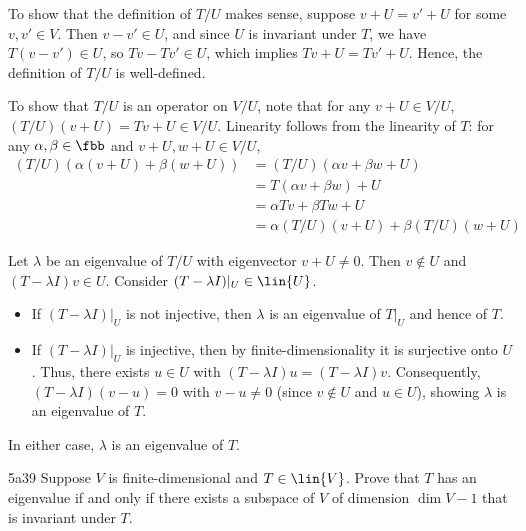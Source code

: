 \begin{solenum}
    \item  To show that the definition of $T / U$ makes sense, suppose $v + U = v' + U$ for some $v, v' \in V$.
	Then $v - v' \in U$, and since $U$ is invariant under $T$, we have $T(v - v') \in U$, so $Tv - Tv' \in U$, which implies $Tv + U = Tv' + U$.
	Hence, the definition of $T / U$ is well-defined.

    To show that $T / U$ is an operator on $V / U$, note that for any $v + U \in V / U$, $(T / U)(v + U) = Tv + U \in V / U$.
	Linearity follows from the linearity of $T$: for any $\alpha, \beta \in \fbb$ and $v + U, w + U \in V / U$,
    \begin{align*}
        (T / U)(\alpha(v + U) + \beta(w + U)) &= (T / U)(\alpha v + \beta w + U) \\
        &= T(\alpha v + \beta w) + U \\
        &= \alpha Tv + \beta Tw + U \\
        &= \alpha(T / U)(v + U) + \beta(T / U)(w + U)
    \end{align*}
    \item Let $\lambda$ be an eigenvalue of $T/U$ with eigenvector $v+U \neq 0$.
    Then $v \notin U$ and $(T-\lambda I)v \in U$.
    Consider $(T-\lambda I) \vert_U \in \lin{U}$.
    \begin{itemize}
        \item If $(T-\lambda I) \vert_U$ is not injective, then $\lambda$ is an eigenvalue of $T \vert_U$ and hence of $T$.
        \item If $(T-\lambda I) \vert_U$ is injective, then by finite-dimensionality it is surjective onto $U$. Thus, there exists $u \in U$ with $(T-\lambda I)u = (T-\lambda I)v$.
        Consequently, $(T-\lambda I)(v-u)=0$ with $v-u \neq 0$ (since $v \notin U$ and $u \in U$), showing $\lambda$ is an eigenvalue of $T$.
    \end{itemize}
    In either case, $\lambda$ is an eigenvalue of $T$.
\end{solenum}

\begin{exercise}{5a39}
    Suppose $V$ is finite-dimensional and $T \in \lin{V}$.
	Prove that $T$ has an eigenvalue if and only if there exists a subspace of $V$ of dimension $\dim V - 1$ that is invariant under $T$.
\end{exercise}

